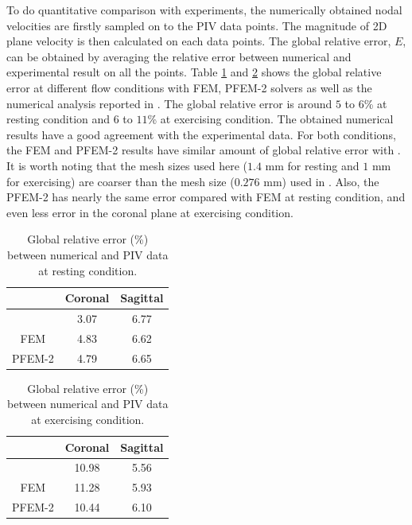 To do quantitative comparison with experiments, the numerically obtained nodal velocities are firstly sampled on to the PIV data points. The magnitude of 2D plane velocity is then calculated on each data points. The global relative error, $E$, can be obtained by averaging the relative error between numerical and experimental result on all the points. Table \ref{tab:rest} and \ref{tab:exercise} shows the global relative error at different flow conditions with FEM, PFEM-2 solvers as well as the numerical analysis reported in \cite{craven_cfd}. The global relative error is around $5$ to $6$\% at resting condition and $6$ to $11$\% at exercising condition. The obtained numerical results have a good agreement with the experimental data. For both conditions, the FEM and PFEM-2 results have similar amount of global relative error with \cite{craven_cfd}. It is worth noting that the mesh sizes used here ($1.4$ mm for resting and $1$ mm for exercising) are coarser than the mesh size ($0.276$ mm) used in \cite{craven_cfd}. Also, the PFEM-2 has nearly the same error compared with FEM at resting condition, and even less error in the coronal plane at exercising condition.

\begin{table}[h!]
\caption {Global relative error (\%) between numerical and PIV data at resting condition.} \label{tab:rest}
\centering
\begin{tabular}{|c|c|c|}
\hline
       & Coronal & Sagittal \\ \hline
\cite{craven_cfd}  & 3.07    & 6.77     \\ \hline
FEM    & 4.83    & 6.62     \\ \hline
PFEM-2 & 4.79    & 6.65     \\ \hline
\end{tabular}
\end{table}

\begin{table}[h!]
\caption {Global relative error (\%) between numerical and PIV data at exercising condition.} \label{tab:exercise}
\centering
\begin{tabular}{|c|c|c|}
\hline
       & Coronal & Sagittal \\ \hline
\cite{craven_cfd}  & 10.98	&5.56 \\ \hline
FEM    &  11.28    &  5.93  \\ \hline
PFEM-2 &  10.44   &  6.10     \\ \hline
\end{tabular}
\end{table}
